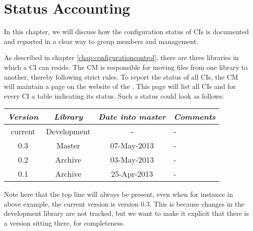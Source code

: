 \chapter{Status Accounting}
\label{chap:statusaccounting}
In this chapter, we will discuss how the configuration status of CIs is documented and reported in a clear way to group members and management.

As described in chapter \ref{chap:configurationcontrol}, there are three libraries in which a CI can reside. The CM is responsible for moving files from one library to another, thereby following strict rules. To report the status of all CIs, the CM will maintain a page on the website of the \applicationname{}. This page will list all CIs and for every CI a table indicating its status. Such a status could look as follows:

\begin{center}
\begin{tabular}{@{}cccl@{}}
	\toprule
	\emph{Version} & \emph{Library} & \emph{Date into master} & \emph{Comments} \\
	\midrule
	current & Development &           - & - \\
	0.3     & Master      & 07-May-2013 & - \\
	0.2     & Archive     & 03-May-2013 & - \\
	0.1     & Archive     & 25-Apr-2013 & - \\
	\bottomrule
\end{tabular}
\end{center}

\noindent Note here that the top line will always be present, even when for instance in above example, the current version is version 0.3. This is because changes in the development library are not tracked, but we want to make it explicit that there is a version sitting there, for completeness.